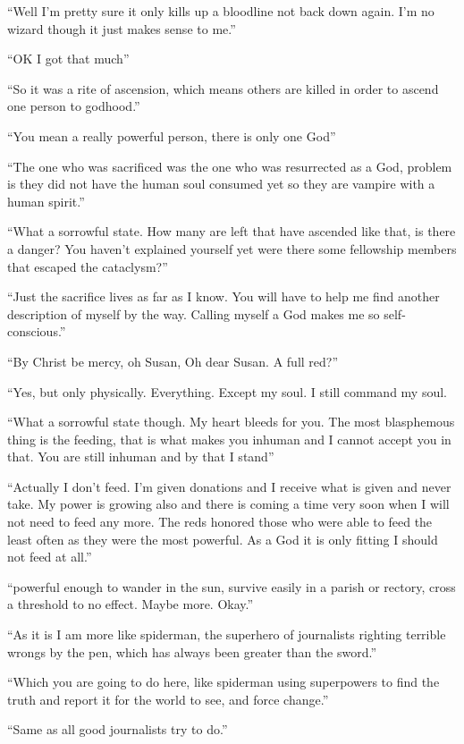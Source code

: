 ``Well I'm pretty sure it only kills up a bloodline not back down again. I'm no wizard though it just makes sense to me.''

``OK I got that much''

``So it was a rite of ascension, which means others are killed in order to ascend one person to godhood.''

``You mean a really powerful person, there is only one God''

``The one who was sacrificed was the one who was resurrected as a God, problem is they did not have the human soul consumed yet so they are vampire with a human spirit.''

``What a sorrowful state. How many are left that have ascended like that, is there a danger? You haven't explained yourself yet were there some fellowship members that escaped the 
cataclysm?''

``Just the sacrifice lives as far as I know. You will have to help me find another description of myself by the way. Calling myself a God makes me so self-conscious.''

``By Christ be mercy, oh Susan, Oh dear Susan. A full red?''

``Yes, but only physically. Everything. Except my soul. I still command my soul.

``What a sorrowful state though. My heart bleeds for you. The most blasphemous thing is the feeding, that is what makes you inhuman and I cannot accept you in that. You are still inhuman and by that I stand''

``Actually I don't feed. I'm given donations and I receive what is given and never take. My power is growing also and there is coming a time very soon when I will not need to feed any more. The reds honored those who were able to feed the least often as they were the most powerful. As a God it is only fitting I should not feed at all.''

``powerful enough to wander in the sun, survive easily in a parish or rectory, cross a threshold to no effect. Maybe more. Okay.''

``As it is I am more like spiderman, the superhero of journalists righting terrible wrongs by the pen, which has always been greater than the sword.''

``Which you are going to do here, like spiderman using superpowers to find the truth and report it for the world to see, and force change.''

``Same as all good journalists try to do.''

